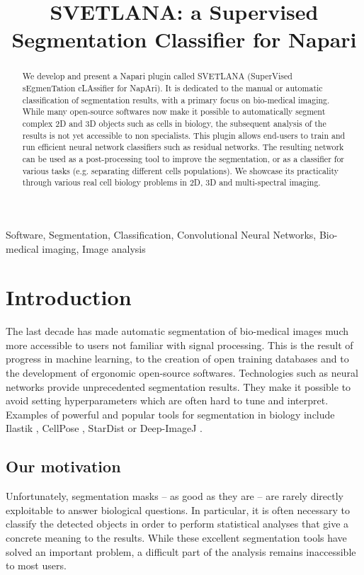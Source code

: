 \documentclass{article}
\title{SVETLANA: a Supervised Segmentation Classifier for Napari}
\begin{document}
%
\maketitle
%
\begin{abstract}
We develop and present a Napari plugin called SVETLANA (SuperVised sEgmenTation cLAssifier for NapAri). It is dedicated to the manual or automatic classification of segmentation results, with a primary focus on bio-medical imaging.
While many open-source softwares now make it possible to automatically segment complex 2D and 3D objects such as cells in biology, the subsequent analysis of the results is not yet accessible to non specialists. 
This plugin allows end-users to train and run efficient neural network classifiers such as residual networks. 
The resulting network can be used as a post-processing tool to improve the segmentation, or as a classifier for various tasks (e.g. separating different cells populations).
We showcase its practicality through various real cell biology problems in 2D, 3D and multi-spectral imaging.
\end{abstract}
%
\begin{keywords}
Software, Segmentation, Classification, Convolutional Neural Networks, Bio-medical imaging, Image analysis
\end{keywords}
%
\section{Introduction}
\label{sec:intro}

The last decade has made automatic segmentation of bio-medical images much more accessible to users not familiar with signal processing. 
This is the result of progress in machine learning, to the creation of open training databases and to the development of ergonomic open-source softwares. Technologies such as neural networks provide unprecedented segmentation results. They make it possible to avoid setting hyperparameters which are often hard to tune and interpret. 
Examples of powerful and popular tools for segmentation in biology include Ilastik \cite{berg2019ilastik}, CellPose \cite{stringer2021cellpose}, StarDist \cite{fazeli2020automated} or Deep-ImageJ \cite{gomez2021deepimagej}. 

\subsection{Our motivation}

Unfortunately, segmentation masks -- as good as they are -- are rarely directly exploitable to answer biological questions. In particular, it is often necessary to classify the detected objects in order to perform statistical analyses that give a concrete meaning to the results. 
While these excellent segmentation tools have solved an important problem, a difficult part of the analysis remains inaccessible to most users.
\end{document}
